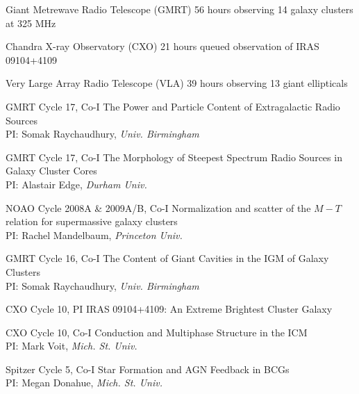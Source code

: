 \documentclass[12pt]{cv}
\begin{document}
\begin{llist}


Giant Metrewave Radio Telescope (GMRT)
56 hours observing 14 galaxy clusters at 325 MHz

Chandra X-ray Observatory (CXO)
21 hours queued observation of IRAS 09104+4109

Very Large Array Radio Telescope (VLA)
39 hours observing 13 giant ellipticals



GMRT Cycle 17, Co-I
The Power and Particle Content of Extragalactic Radio Sources\\%
PI: Somak Raychaudhury, {\textit{Univ. Birmingham}}

GMRT Cycle 17, Co-I
The Morphology of Steepest Spectrum Radio Sources in Galaxy Cluster Cores\\%
PI: Alastair Edge, {\textit{Durham Univ.}}

NOAO Cycle 2008A \& 2009A/B, Co-I
Normalization and scatter of the $M-T$ relation for supermassive galaxy clusters\\
PI: Rachel Mandelbaum, {\textit{Princeton Univ.}}

GMRT Cycle 16, Co-I
The Content of Giant Cavities in the IGM of Galaxy Clusters\\%
PI: Somak Raychaudhury, {\textit{Univ. Birmingham}}

CXO Cycle 10, PI
IRAS 09104+4109: An Extreme Brightest Cluster Galaxy%

CXO Cycle 10, Co-I
Conduction and Multiphase Structure in the ICM\\%
PI: Mark Voit, {\textit{Mich. St. Univ.}}

Spitzer Cycle 5, Co-I
Star Formation and AGN Feedback in BCGs\\%
PI: Megan Donahue, {\textit{Mich. St. Univ.}}


\end{llist}
\end{document}
